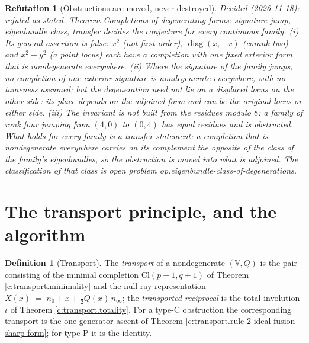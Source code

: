 \documentclass[11pt]{article}
\newtheorem{refutation}[theorem]{Refutation}
\theoremstyle{definition}
\newtheorem{definition}[theorem]{Definition}
\theoremstyle{plain}
\providecommand{\Cl}{}\renewcommand{\Cl}{\mathrm{Cl}}
\providecommand{\nInf}{}\renewcommand{\nInf}{n_\infty}
\providecommand{\nO}{}\renewcommand{\nO}{n_0}
\begin{document}
\begin{refutation}[Obstructions are moved, never destroyed]
\emph{Decided (2026-11-18): refuted as stated.} Theorem \emph{Completions of degenerating forms: signature jump, eigenbundle class, transfer} decides the conjecture for every continuous family. (i) Its general assertion is false: $x^{2}$ (not first order), $\operatorname{diag}(x,-x)$ (corank two) and $x^{2} + y^{2}$ (a point locus) each have a completion with one fixed exterior form that is nondegenerate everywhere. (ii) Where the signature of the family jumps, no completion of one exterior signature is nondegenerate everywhere, with no tameness assumed; but the degeneration need not lie on a displaced locus on the other side: its place depends on the adjoined form and can be the original locus or either side. (iii) The invariant is not built from the residues modulo $8$: a family of rank four jumping from $(4,0)$ to $(0,4)$ has equal residues and is obstructed. What holds for every family is a transfer statement: a completion that is nondegenerate everywhere carries on its complement the opposite of the class of the family's eigenbundles, so the obstruction is moved into what is adjoined. The classification of that class is open problem op.eigenbundle-class-of-degenerations.
\end{refutation}

\section{The transport principle, and the algorithm}

\begin{definition}[Transport]\label{c:obj.transport.transport}
The \emph{transport} of a nondegenerate $(\mathbb{V}, Q)$ is the pair consisting of the minimal completion $\Cl(p{+}1,q{+}1)$ of Theorem \ref{c:transport.minimality} and the null-ray representation $X(x) \;=\; \nO + x + \tfrac12 Q(x)\, \nInf$; the \emph{transported reciprocal} is the total involution $\iota$ of Theorem \ref{c:transport.totality}. For a type-C obstruction the corresponding transport is the one-generator ascent of Theorem \ref{c:transport.rule-2-ideal-fusion-sharp-form}; for type P it is the identity.
\end{definition}
\end{document}
